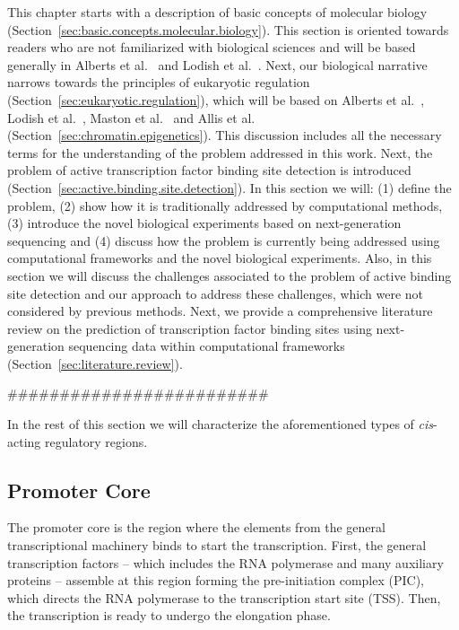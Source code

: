 

This chapter starts with a description of basic concepts of molecular biology (Section~\ref{sec:basic.concepts.molecular.biology}). This section is oriented towards readers who are not familiarized with biological sciences and will be based generally in Alberts et al.~\cite{alberts2007} and Lodish et al.~\cite{lodish2007}. Next, our biological narrative narrows towards the principles of eukaryotic regulation (Section~\ref{sec:eukaryotic.regulation}), which will be based on Alberts et al.~\cite{alberts2007}, Lodish et al.~\cite{lodish2007}, Maston et al.~\cite{maston2006} and Allis et al.~\cite{allis2007} (Section~\ref{sec:chromatin.epigenetics}). This discussion includes all the necessary terms for the understanding of the problem addressed in this work. Next, the problem of active transcription factor binding site detection is introduced (Section~\ref{sec:active.binding.site.detection}). In this section we will: (1) define the problem, (2) show how it is traditionally addressed by computational methods, (3) introduce the novel biological experiments based on next-generation sequencing and (4) discuss how the problem is currently being addressed using computational frameworks and the novel biological experiments. Also, in this section we will discuss the challenges associated to the problem of active binding site detection and our approach to address these challenges, which were not considered by previous methods. Next, we provide a comprehensive literature review on the prediction of transcription factor binding sites using next-generation sequencing data within computational frameworks (Section~\ref{sec:literature.review}). 


#########################



In the rest of this section we will characterize the aforementioned types of \emph{cis}-acting regulatory regions.


\subsection{Promoter Core}
\label{sec:promoter.core}

The promoter core is the region where the elements from the general transcriptional machinery binds to start the transcription. First, the general transcription factors -- which includes the RNA polymerase and many auxiliary proteins -- assemble at this region forming the pre-initiation complex (PIC), which directs the RNA polymerase to the transcription start site (TSS). Then, the transcription is ready to undergo the elongation phase.

